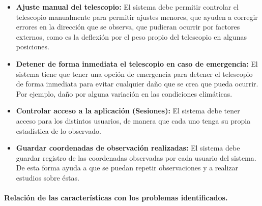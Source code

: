 \documentclass[letterpaper,titlepage,spanish,10pt]{article}
\begin{document}
\begin{itemize}
	\item \textbf{Ajuste manual del telescopio:} El sistema debe permitir controlar el 
telescopio manualmente para permitir ajustes menores, que ayuden a corregir errores 
en la direcci\'on que se observa, que pudieran ocurrir por factores externos, como 
es la deflexi\'on por el peso propio del telescopio en algunas posiciones.

	\item \textbf{Detener de forma inmediata el telescopio en caso de emergencia:} El 
sistema tiene que tener una opci\'on de emergencia para detener el telescopio de 
forma inmediata para evitar cualquier da\~no que se crea que pueda ocurrir. Por 
ejemplo, da\~no por alguna variaci\'on en las condiciones clim\'aticas.

	\item \textbf{Controlar acceso a la aplicaci\'on (Sesiones):} El sistema debe tener 
acceso para los distintos usuarios, de manera que cada uno tenga su propia 
estad\'istica de lo observado.

	\item \textbf{Guardar coordenadas de observaci\'on realizadas:} El sistema debe 
guardar registro de las coordenadas observadas por cada usuario del sistema. De 
esta forma ayuda a que se puedan repetir observaciones y a realizar estudios sobre 
\'estas.

	\end{itemize}


\newpage

\paragraph{Relaci\'on de las caracter\'isticas con los problemas identificados.}
\end{document}
